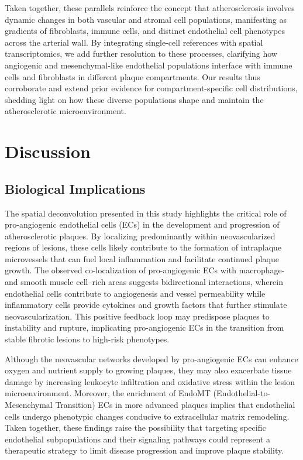 \documentclass[a4paper,12pt]{article}
\begin{document}
Taken together, these parallels reinforce the concept that atherosclerosis involves dynamic changes in both vascular and stromal cell populations, manifesting as gradients of fibroblasts, immune cells, and distinct endothelial cell phenotypes across the arterial wall. By integrating single-cell references with spatial transcriptomics, we add further resolution to these processes, clarifying how angiogenic and mesenchymal-like endothelial populations interface with immune cells and fibroblasts in different plaque compartments. Our results thus corroborate and extend prior evidence for compartment-specific cell distributions, shedding light on how these diverse populations shape and maintain the atherosclerotic microenvironment.




\section{Discussion}

\subsection{Biological Implications}
The spatial deconvolution presented in this study highlights the critical role of pro-angiogenic endothelial cells (ECs) in the development and progression of atherosclerotic plaques. By localizing predominantly within neovascularized regions of lesions, these cells likely contribute to the formation of intraplaque microvessels that can fuel local inflammation and facilitate continued plaque growth. The observed co-localization of pro-angiogenic ECs with macrophage- and smooth muscle cell–rich areas suggests bidirectional interactions, wherein endothelial cells contribute to angiogenesis and vessel permeability while inflammatory cells provide cytokines and growth factors that further stimulate neovascularization. This positive feedback loop may predispose plaques to instability and rupture, implicating pro-angiogenic ECs in the transition from stable fibrotic lesions to high-risk phenotypes.

Although the neovascular networks developed by pro-angiogenic ECs can enhance oxygen and nutrient supply to growing plaques, they may also exacerbate tissue damage by increasing leukocyte infiltration and oxidative stress within the lesion microenvironment. Moreover, the enrichment of EndoMT (Endothelial-to-Mesenchymal Transition) ECs in more advanced plaques implies that endothelial cells undergo phenotypic changes conducive to extracellular matrix remodeling. Taken together, these findings raise the possibility that targeting specific endothelial subpopulations and their signaling pathways could represent a therapeutic strategy to limit disease progression and improve plaque stability.
\end{document}
